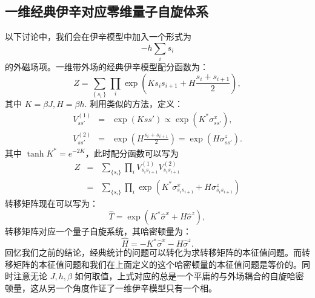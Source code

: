 \documentclass[UTF8]{ctexart}
\begin{document}
\subsection*{一维经典伊辛对应零维量子自旋体系}
\noindent
以下讨论中，我们会在伊辛模型中加入一个形式为
\begin{equation}
	-h\sum_{i}s_{i}
\end{equation} 
的外磁场项。一维带外场的经典伊辛模型配分函数为：
\begin{equation}
	Z=\sum_{\left\{ s_{i}\right\} }\prod_{i} \exp\left(Ks_{i}s_{i+1}+H \frac{s_{i}+s_{i+1}}{2}\right),
\end{equation}
其中 $K=\beta J,H=\beta h$. 利用类似的方法，定义：
\begin{eqnarray}
	V_{ss'}^{(1)} &=& \exp(Kss') \propto \exp(K^{*}\sigma^{x}_{ss'}), \\
	V_{ss'}^{(2)} &=& \exp\left(H\frac{s_i+s_{i+1}}{2}\right) = \exp(H\sigma^z_{ss'}).
\end{eqnarray}
其中 $\tanh K^{*}=e^{-2K}$，此时配分函数可以写为
\begin{eqnarray}
	Z &=& \sum_{\{s_i\}}\prod_i V^{(1)}_{s_{i}s_{i+1}} V^{(2)}_{s_{i}s_{i+1}} \\
	&=& \sum_{\{s_i\}}\prod_i \exp(K^* \sigma^x_{s_{i}s_{i+1}}+H\sigma^z_{s_{i}s_{i+1}})
\end{eqnarray}
转移矩阵现在可以写为：
\begin{equation}
	\hat T = \exp(K^* \hat\sigma^x + H \hat\sigma^z),
\end{equation}
转移矩阵对应一个量子自旋系统，其哈密顿量为：
\begin{equation}
	\hat{H}=-K^* \hat\sigma^{x}-H \hat\sigma^{z}.
\end{equation}
回忆我们之前的结论，经典统计的问题可以转化为求转移矩阵的本征值问题。而转移矩阵的本征值问题和我们在上面定义的这个哈密顿量的本征值问题是等价的。同时注意无论 $J,h,\beta$ 如何取值，上式对应的总是一个平庸的与外场耦合的自旋哈密顿量，这从另一个角度作证了一维伊辛模型只有一个相。
\end{document}
